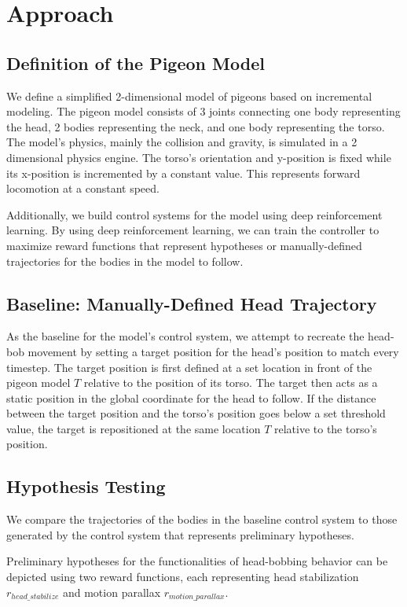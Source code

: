 \chapter{Approach}
\section{Definition of the Pigeon Model}
  We define a simplified 2-dimensional model of pigeons based on incremental modeling. The pigeon model consists of 3 joints connecting one body representing the head, 2 bodies representing the neck, and one body representing the torso. The model's physics, mainly the collision and gravity, is simulated in a 2 dimensional physics engine. The torso's orientation and y-position is fixed while its x-position is incremented by a constant value. This represents forward locomotion at a constant speed.

  Additionally, we build control systems for the model using deep reinforcement learning. By using deep reinforcement learning, we can train the controller to maximize reward functions that represent hypotheses or manually-defined trajectories for the bodies in the model to follow.

\section{Baseline: Manually-Defined Head Trajectory}
  As the baseline for the model's control system, we attempt to recreate the head-bob movement by setting a target position for the head's position to match every timestep. The target position is first defined at a set location in front of the pigeon model $T$ relative to the position of its torso. The target then acts as a static position in the global coordinate for the head to follow. If the distance between the target position and the torso's position goes below a set threshold value, the target is repositioned at the same location $T$ relative to the torso's position.

\section{Hypothesis Testing}
  We compare the trajectories of the bodies in the baseline control system to those generated by the control system that represents preliminary hypotheses.

  Preliminary hypotheses for the functionalities of head-bobbing behavior can be depicted using two reward functions, each representing head stabilization ${r_{head\_stabilize}}$ and motion parallax ${r_{motion\_parallax}}$.

